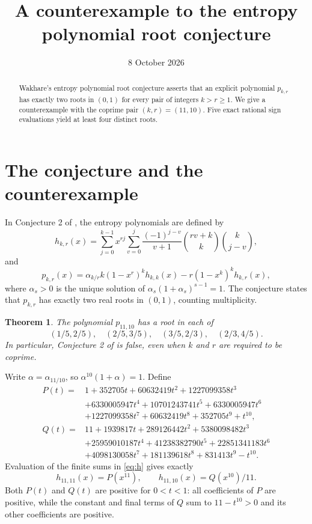 \documentclass[11pt]{article}
\title{A counterexample to the entropy polynomial root conjecture}
\author{}
\date{8 October 2026}
\newtheorem{theorem}{Theorem}
\begin{document}
\maketitle
\vspace{-1.8em}
\begin{abstract}
Wakhare's entropy polynomial root conjecture asserts that an explicit polynomial
$p_{k,r}$ has exactly two roots in $(0,1)$ for every pair of integers $k>r\geq1$.
We give a counterexample with the coprime pair $(k,r)=(11,10)$.
Five exact rational sign evaluations yield at least four distinct roots.
\end{abstract}

\section{The conjecture and the counterexample}
In Conjecture 2 of \cite{Wakhare}, the entropy polynomials are defined by
\begin{equation}\label{eq:h}
h_{k,r}(x)=\sum_{j=0}^{k-1}x^{rj}
 \sum_{v=0}^{j}\frac{(-1)^{j-v}}{v+1}
 \binom{rv+k}{k}\binom{k}{j-v},
\end{equation}
and
\begin{equation}\label{eq:p}
p_{k,r}(x)=\alpha_{k/r}k(1-x^r)^k h_{k,k}(x)
-r(1-x^k)^k h_{k,r}(x),
\end{equation}
where $\alpha_s>0$ is the unique solution of
$\alpha_s(1+\alpha_s)^{s-1}=1$.
The conjecture states that $p_{k,r}$ has exactly two real roots in $(0,1)$,
counting multiplicity.

\begin{theorem}\label{thm:counter}
The polynomial $p_{11,10}$ has a root in each of
\[
(1/5,2/5),\quad (2/5,3/5),\quad (3/5,2/3),\quad (2/3,4/5).
\]
In particular, Conjecture 2 of \cite{Wakhare} is false, even when $k$ and $r$
are required to be coprime.
\end{theorem}

Write $\alpha=\alpha_{11/10}$, so $\alpha^{10}(1+\alpha)=1$.
Define
\begin{align*}
P(t)={}&1+352705t+60632419t^2+1227099358t^3\\
 &+6330005947t^4+10701243741t^5+6330005947t^6\\
 &+1227099358t^7+60632419t^8+352705t^9+t^{10},\\[3pt]
Q(t)={}&11+1939817t+289126442t^2+5380098482t^3\\
 &+25959010187t^4+41238382790t^5+22851341183t^6\\
 &+4098130058t^7+181139618t^8+831413t^9-t^{10}.
\end{align*}
Evaluation of the finite sums in \eqref{eq:h} gives exactly
\begin{equation}\label{eq:coeff}
h_{11,11}(x)=P(x^{11}),\qquad h_{11,10}(x)=Q(x^{10})/11.
\end{equation}
Both $P(t)$ and $Q(t)$ are positive for $0<t<1$: all coefficients of $P$ are
positive, while the constant and final terms of $Q$ sum to $11-t^{10}>0$
and its other coefficients are positive.
\end{document}
